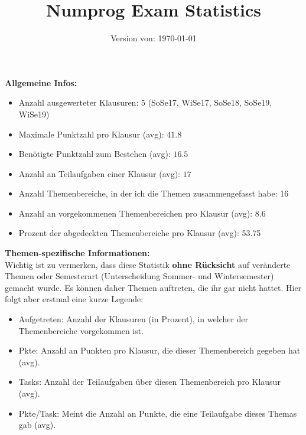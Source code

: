 \documentclass{scrartcl}
\title{Numprog Exam Statistics}
\subtitle{Version von: \today}
\date{\vspace{-5ex}}
\begin{document}
	\thispagestyle{empty}
	\maketitle
	\textbf{Allgemeine Infos:}
	\begin{itemize}
		\item Anzahl ausgewerteter Klausuren: $5$ (SoSe17, WiSe17, SoSe18, SoSe19, WiSe19)
		\item Maximale Punktzahl pro Klausur (avg): $41.8$
		\item Benötigte Punktzahl zum Bestehen (avg): $16.5$
		\item Anzahl an Teilaufgaben einer Klausur (avg): $17$
		\item Anzahl Themenbereiche, in der ich die Themen zusammengefasst habe: 16
		\item Anzahl an vorgekommenen Themenbereichen pro Klausur (avg): 8.6
		\item Prozent der abgedeckten Themenbereiche pro Klausur (avg): 53.75
	\end{itemize}
	\sbreak
	\textbf{Themen-spezifische Informationen:}\\
	Wichtig ist zu vermerken, dass diese Statistik \textbf{ohne Rücksicht} auf veränderte Themen oder Semesterart (Unterscheidung Sommer- und Wintersemester) gemacht wurde. Es können daher Themen auftreten, die ihr gar nicht hattet. Hier folgt aber erstmal eine kurze Legende:
	\begin{itemize}
		\item Aufgetreten: Anzahl der Klausuren (in Prozent), in welcher der Themenbereiche vorgekommen ist.
		\item Pkte: Anzahl an Punkten pro Klausur, die dieser Themenbereich gegeben hat (avg).
		\item Tasks: Anzahl der Teilaufgaben über diesen Themenbereich pro Klausur (avg).
		\item Pkte/Task: Meint die Anzahl an Punkte, die eine Teilaufgabe dieses Themas gab (avg).
	\end{itemize}
	
\end{document}
